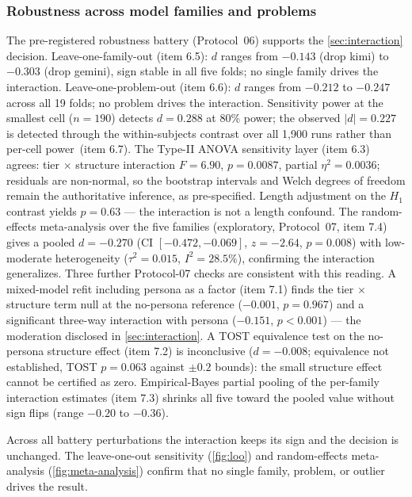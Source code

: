 \documentclass[12pt,a4paper]{article}
\begin{document}
\subsubsection{Robustness across model families and problems}\label{sec:robustness-families}

The pre-registered robustness battery (Protocol~06) supports the
\cref{sec:interaction} decision.
Leave-one-family-out (item 6.5): $d$ ranges from $-0.143$ (drop kimi) to $-0.303$ (drop
gemini), sign stable in all five folds; no single family drives the
interaction. Leave-one-problem-out (item 6.6): $d$ ranges from $-0.212$ to $-0.247$ across
all 19 folds; no problem drives the interaction. Sensitivity power at the
smallest cell ($n = 190$) detects $d = 0.288$ at 80\% power; the observed $|d|
= 0.227$ is detected through the within-subjects contrast over all 1{,}900 runs
rather than per-cell power~(item 6.7). The Type-II ANOVA sensitivity layer (item 6.3)
agrees: tier $\times$ structure interaction $F = 6.90$, $p = 0.0087$, partial
$\eta^2 = 0.0036$; residuals are non-normal, so the bootstrap intervals and
Welch degrees of freedom remain the authoritative inference, as pre-specified.
Length adjustment on the $H_1$ contrast
yields $p = 0.63$ --- the interaction is not a length confound. The
random-effects meta-analysis over the five families (exploratory, Protocol~07,
item 7.4) gives a pooled $d =
-0.270$ (CI $[-0.472, -0.069]$, $z = -2.64$, $p = 0.008$) with low-moderate
heterogeneity ($\tau^2 = 0.015$, $I^2 = 28.5\%$), confirming the interaction
generalizes. Three further Protocol-07 checks are consistent with this
reading. A mixed-model refit including persona as a factor (item 7.1) finds
the tier $\times$ structure term null at the no-persona reference
($-0.001$, $p = 0.967$) and a significant three-way interaction with persona
($-0.151$, $p < 0.001$) --- the moderation disclosed in
\cref{sec:interaction}. A TOST equivalence test on the no-persona structure
effect (item 7.2) is inconclusive ($d = -0.008$; equivalence not established,
TOST $p = 0.063$ against $\pm 0.2$ bounds): the small structure effect cannot
be certified as zero. Empirical-Bayes partial pooling of the per-family
interaction estimates (item 7.3) shrinks all five toward the pooled value
without sign flips (range $-0.20$ to $-0.36$).

Across all battery perturbations the interaction keeps its sign and the
decision is unchanged. The leave-one-out sensitivity (\cref{fig:loo})
and random-effects meta-analysis (\cref{fig:meta-analysis}) confirm that no
single family, problem, or outlier drives the result.
\end{document}
